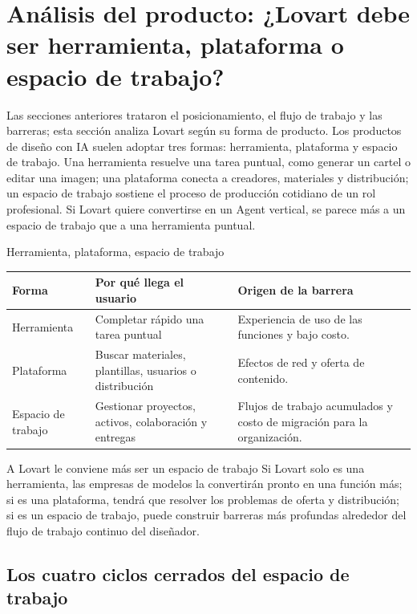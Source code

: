 \section{Análisis del producto: ¿Lovart debe ser herramienta, plataforma o espacio de trabajo?}

Las secciones anteriores trataron el posicionamiento, el flujo de trabajo y las barreras; esta sección analiza Lovart según su forma de producto. Los productos de diseño con IA suelen adoptar tres formas: herramienta, plataforma y espacio de trabajo. Una herramienta resuelve una tarea puntual, como generar un cartel o editar una imagen; una plataforma conecta a creadores, materiales y distribución; un espacio de trabajo sostiene el proceso de producción cotidiano de un rol profesional. Si Lovart quiere convertirse en un Agent vertical, se parece más a un espacio de trabajo que a una herramienta puntual.

\begin{knowledgebox}{Herramienta, plataforma, espacio de trabajo}
\begin{tabularx}{\textwidth}{p{}p{}X}
\toprule
Forma & Por qué llega el usuario & Origen de la barrera \\
\midrule
Herramienta & Completar rápido una tarea puntual & Experiencia de uso de las funciones y bajo costo. \\
Plataforma & Buscar materiales, plantillas, usuarios o distribución & Efectos de red y oferta de contenido. \\
Espacio de trabajo & Gestionar proyectos, activos, colaboración y entregas & Flujos de trabajo acumulados y costo de migración para la organización. \\
\bottomrule
\end{tabularx}
\end{knowledgebox}

\begin{importantbox}{A Lovart le conviene más ser un espacio de trabajo}
Si Lovart solo es una herramienta, las empresas de modelos la convertirán pronto en una función más; si es una plataforma, tendrá que resolver los problemas de oferta y distribución; si es un espacio de trabajo, puede construir barreras más profundas alrededor del flujo de trabajo continuo del diseñador.
\end{importantbox}

\subsection{Los cuatro ciclos cerrados del espacio de trabajo}

